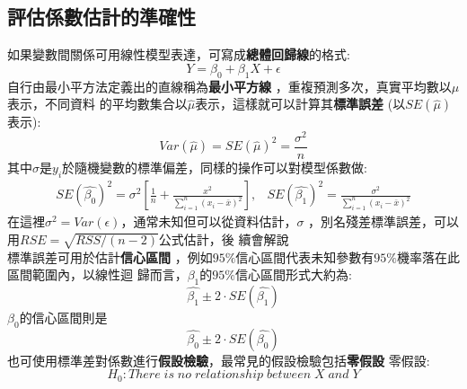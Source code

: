 \documentclass{report} %
\begin{document}
    \subsection{評估係數估計的準確性}
      如果變數間關係可用線性模型表達，可寫成{\bf 總體回歸線}的格式:
	  \begin{equation}
        Y = \beta_0 + \beta_1X + \epsilon
      \end{equation}
      自行由最小平方法定義出的直線稱為{\bf 最小平方線}
        ，重複預測多次，真實平均數以$\mu$表示，不同資料
        的平均數集合以$\hat{\mu}$表示，這樣就可以計算其{\bf 標準誤差}
        (以$SE(\hat{\mu})$表示):
      \begin{equation}
        Var(\hat{\mu}) = SE(\hat{\mu}) ^ 2 = \frac{\sigma ^ 2}{n}
      \end{equation}
      其中$\sigma$是$y_i$於隨機變數的標準偏差，同樣的操作可以對模型係數做:
      \begin{equation}
        \left.
          \begin{array}{cc}
            SE(\hat{\beta_0}) ^ 2 = \sigma ^ 2\left[\frac{1}{n} +
              \frac{x ^ 2}{\sum_{i = 1} ^ {n}(x_i - \bar{x}) ^
              2}\right], & SE(\hat{\beta_1}) ^ 2 = \frac{\sigma ^ 2}
              {\sum_{i = 1} ^ {n}(x_i - \bar{x}) ^ 2}
          \end{array}
        \right.
      \end{equation}
      在這裡$\sigma ^ 2=Var(\epsilon)$，通常未知但可以從資料估計，$\sigma$
        ，別名殘差標準誤差，可以用$RSE = \sqrt{RSS / (n - 2)}$公式估計，後
        續會解說\\
      標準誤差可用於估計{\bf 信心區間}
        ，例如$95\%$信心區間代表未知參數有$95\%$機率落在此區間範圍內，以線性迴
        歸而言，$\beta_1$的$95\%$信心區間形式大約為:
      \begin{equation}
        \hat{\beta_1} \pm 2 \cdot SE(\hat{\beta_1})
      \end{equation}
      $\beta_0$的信心區間則是
      \begin{equation}
        \hat{\beta_0} \pm 2 \cdot SE(\hat{\beta_0})
      \end{equation}
      也可使用標準差對係數進行{\bf 假設檢驗}，最常見的假設檢驗包括{\bf 零假設}\marginpar
        {零假設}:
      \begin{equation}
        H_0 : There\;is\;no\;relationship\;between\;X\;and\;Y
      \end{equation}
\end{document}
